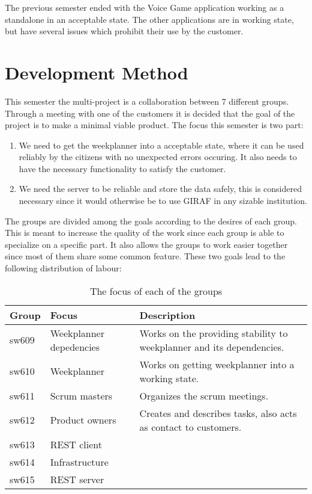 


The previous semester ended with the Voice Game application working as a
standalone in an acceptable state. The other applications are in working state,
but have several issues which prohibit their use by the customer.




\section{Development Method}
This semester the multi-project is a collaboration between 7
different groups. Through a meeting with one of the customers it is
decided that the goal of the project is to make a minimal viable product. The
focus this semester is two part: 
\begin{enumerate}
  \item We need to get the weekplanner into a acceptable state, where it can be
  used reliably by the citizens with no unexpected errors occuring. It also
  needs to have the necessary functionality to satisfy the customer.
  \item We need the server to be reliable and store the data safely, this is
  considered necessary since it would otherwise be to use GIRAF in any sizable
  institution.
\end{enumerate}

The groups are divided among the goals according to the desires of each
group. This is meant to increase the quality of the work since each group is
able to specialize on a specific part. It also allows the groups to work easier
together since most of them share some common feature. These two goals lead to
the following distribution of labour:

\begin{table}[H]
\centering
\begin{tabular}{|p{1cm}|p{3cm}|p{8cm}|}
\hline
Group & Focus & Description \\ \hline
sw609 & Weekplanner depedencies & Works on the providing stability to
weekplanner and its dependencies.\\\hline 
sw610 & Weekplanner & Works on getting weekplanner into a working
state.\\
\hline sw611 & Scrum masters & Organizes the scrum meetings. \\\hline 
sw612 & Product owners & Creates and describes tasks, also acts as contact to
customers. \\\hline 
sw613 & REST client & \\ \hline

sw614 & Infrastructure & \\ \hline

sw615 & REST server & \\ \hline

\end{tabular}
\caption{The focus of each of the groups}
\label{GroupDivision}
\end{table}

